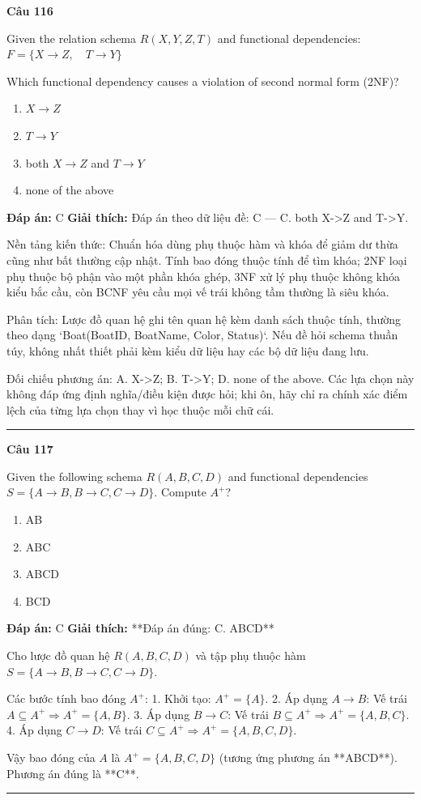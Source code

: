 \documentclass[11pt,a4paper]{article}
\newenvironment{question}[1]{%
  \par\vspace{1em}\noindent\textbf{\large Câu #1}\par\vspace{0.4em}
}{%
  \par\vspace{1em}\hrule\vspace{0.6em}
}
\newenvironment{choices}{%
  \begin{enumerate}[label=\textbf{\Alph*.},leftmargin=2.2em,itemsep=2pt,topsep=3pt]
}{%
  \end{enumerate}
}
\newcommand{\choice}{\item}
\begin{document}
\begin{question}{116}
Given the relation schema \(R(X, Y, Z, T)\) and functional dependencies:
\(F = \{ X \rightarrow Z, \quad T \rightarrow Y \}\)

Which functional dependency causes a violation of second normal form (2NF)?
\begin{choices}
\choice \(X \rightarrow Z\)
\choice \(T \rightarrow Y\)
\choice both \(X \rightarrow Z\) and \(T \rightarrow Y\)
\choice none of the above
\end{choices}
\textbf{Đáp án:} C
\textbf{Giải thích:} Đáp án theo dữ liệu đề: C — C. both X->Z and T->Y.

Nền tảng kiến thức: Chuẩn hóa dùng phụ thuộc hàm và khóa để giảm dư thừa cũng như bất thường cập nhật. Tính bao đóng thuộc tính để tìm khóa; 2NF loại phụ thuộc bộ phận vào một phần khóa ghép, 3NF xử lý phụ thuộc không khóa kiểu bắc cầu, còn BCNF yêu cầu mọi vế trái không tầm thường là siêu khóa.

Phân tích: Lược đồ quan hệ ghi tên quan hệ kèm danh sách thuộc tính, thường theo dạng `Boat(BoatID, BoatName, Color, Status)`. Nếu đề hỏi schema thuần túy, không nhất thiết phải kèm kiểu dữ liệu hay các bộ dữ liệu đang lưu.

Đối chiếu phương án: A. X->Z; B. T->Y; D. none of the above. Các lựa chọn này không đáp ứng định nghĩa/điều kiện được hỏi; khi ôn, hãy chỉ ra chính xác điểm lệch của từng lựa chọn thay vì học thuộc mỗi chữ cái.
\end{question}


\begin{question}{117}
Given the following schema \(R(A, B, C, D)\) and functional dependencies \(S = \{ A \rightarrow B, B \rightarrow C, C \rightarrow D \}\). Compute \(A^+\)?
\begin{choices}
\choice AB
\choice ABC
\choice ABCD
\choice BCD
\end{choices}
\textbf{Đáp án:} C
\textbf{Giải thích:} **Đáp án đúng: C. ABCD**

Cho lược đồ quan hệ \(R(A, B, C, D)\) và tập phụ thuộc hàm \(S = \{ A \rightarrow B, B \rightarrow C, C \rightarrow D \}\).

Các bước tính bao đóng \(A^+\):
1. Khởi tạo: \(A^+ = \{A\}\).
2. Áp dụng \(A \rightarrow B\): Vế trái \(A \subseteq A^+ \Rightarrow A^+ = \{A, B\}\).
3. Áp dụng \(B \rightarrow C\): Vế trái \(B \subseteq A^+ \Rightarrow A^+ = \{A, B, C\}\).
4. Áp dụng \(C \rightarrow D\): Vế trái \(C \subseteq A^+ \Rightarrow A^+ = \{A, B, C, D\}\).

Vậy bao đóng của \(A\) là \(A^+ = \{A, B, C, D\}\) (tương ứng phương án **ABCD**). Phương án đúng là **C**.
\end{question}
\end{document}

